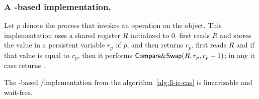 \subsubsection{A \CAS-based implementation.}
Let $p$ denote the process that invokes an operation on the object. This implementation uses a shared register $R$ initialized to 0.  \LL first reads $R$ and stores the value in a persistent variable $r_p$ of $p$, and then returns $r_p$.  \IC first reads $R$ and if that value is equal to $r_p$, then it performs ${\sf Compare\&Swap}(R, r_p, r_p+1)$; in any it case returns \ok.

\begin{figure}[ht!]
\end{figure}

\begin{theorem}
\label{theorem:cas-ll-ic}
The \CAS-based \LL/\IC implementation from the algorithm~\ref{alg:ll-ic-cas} is linearizable and wait-free.
\end{theorem}

